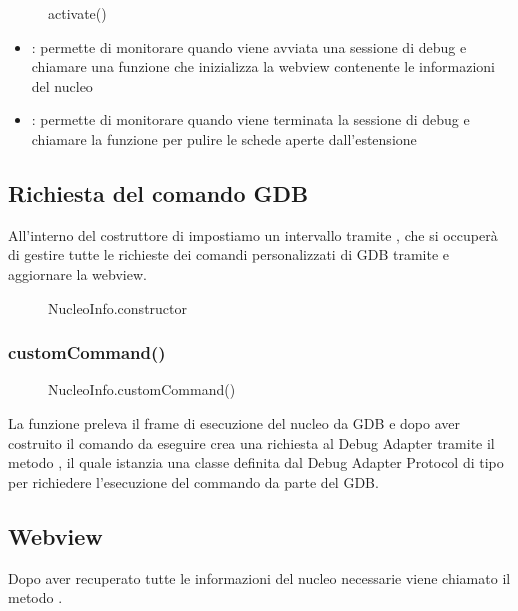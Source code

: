 \begin{figure}[H]
    
    \caption{activate()}
\end{figure}


\begin{itemize}
    \item {}: permette di monitorare quando viene avviata una sessione di debug e chiamare una funzione che inizializza la webview contenente le informazioni del nucleo
    \item {}: permette di monitorare quando viene terminata la sessione di debug e chiamare la funzione per pulire le schede aperte dall'estensione
\end{itemize}

\subsection{Richiesta del comando GDB}
All'interno del costruttore di  impostiamo un intervallo tramite \linebreak {}, che si occuperà di gestire tutte le richieste dei comandi personalizzati di GDB tramite  e aggiornare la webview. 

\begin{figure}[H]
    
    \caption{NucleoInfo.constructor}
\end{figure}

\subsubsection{customCommand()}
\begin{figure}[H]
    
    \caption{NucleoInfo.customCommand()}
\end{figure}

La funzione  preleva il frame di esecuzione del nucleo da GDB e dopo aver costruito il comando da eseguire crea una richiesta al Debug Adapter tramite il metodo , il quale istanzia una classe  definita dal Debug Adapter Protocol di tipo  per richiedere l'esecuzione del commando da parte del GDB. 

\subsection{Webview}
Dopo aver recuperato tutte le informazioni del nucleo necessarie viene chiamato il metodo . 

